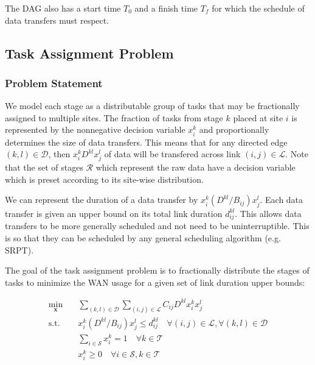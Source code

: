The DAG also has a start time $T_0$ and a finish time $T_f$ for which the schedule of data transfers must respect.

\subsection{Task Assignment Problem}

\subsubsection{Problem Statement}

We model each stage as a distributable group of tasks that may be fractionally assigned to multiple sites.
The fraction of tasks from stage $k$ placed at site $i$ is represented by the nonnegative decision variable $x_i^k$ and proportionally determines the size of data transfers.
This means that for any directed edge $(k,l)\in\mathcal{D}$, then $x_i^kD^{kl}x_j^l$ of data will be transfered across link $(i,j)\in\mathcal{L}$.
Note that the set of stages $\mathcal{R}$ which represent the raw data have a decision variable which is preset according to its site-wise distribution.

We can represent the duration of a data transfer by $x_i^k(D^{kl}/B_{ij})x_j^l$.
Each data transfer is given an upper bound on its total link duration $d_{ij}^{kl}$.
This allows data transfers to be more generally scheduled and not need to be uninterruptible.
This is so that they can be scheduled by any general scheduling algorithm (e.g. SRPT).

The goal of the task assignment problem is to fractionally distribute the stages of tasks to minimize the WAN usage for a given set of link duration upper bounds:

\begin{subequations}\label{eq:opt_task}
	\begin{align}
		\min_{\mathbf{x}} \quad & \sum_{(k,l)\in\mathcal{D}}\sum_{(i,j)\in\mathcal{L}}C_{ij}D^{kl}x_i^kx_j^l \nonumber \\
		\text{s.t.}\quad & x_i^k(D^{kl}/B_{ij})x_j^l \leq d_{ij}^{kl} \quad \forall(i,j)\in\mathcal{L}, \forall(k,l)\in\mathcal{D} \label{eq:opt_task-duration} \\
		& \sum_{i\in\mathcal{S}}x_i^k = 1 \quad \forall k\in\mathcal{T} \label{eq:opt_task-sum1} \\
		& x_i^k \geq 0 \quad \forall i\in\mathcal{S},k\in\mathcal{T} \label{eq:opt_task-nonneg}
	\end{align}
\end{subequations}

